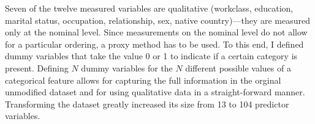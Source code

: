 Seven of the twelve measured variables are qualitative (workclass,
education, marital status, occupation, relationship, sex, native
country)---they are measured only at the nominal level. Since
measurements on the nominal level do not allow for a particular
ordering, a proxy method has to be used. To this end, I defined dummy
variables that take the value 0 or 1 to indicate if a certain
category is present. Defining $N$ dummy variables for the $N$
different possible values of a categorical feature allows for
capturing the full information in the orginal unmodified dataset and for using qualitative data in a straight-forward manner.
Transforming the dataset greatly increased its size from 13 to 104 predictor variables.